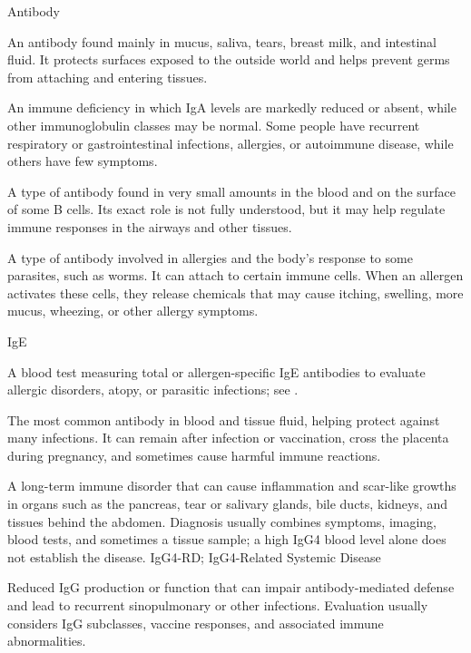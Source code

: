 \synonyms
Antibody

 An antibody found mainly in mucus, saliva, tears, breast milk, and intestinal fluid. It protects surfaces exposed to the outside world and helps prevent germs from attaching and entering tissues.

 An immune deficiency in which IgA levels are markedly reduced or absent, while other immunoglobulin classes may be normal. Some people have recurrent respiratory or gastrointestinal infections, allergies, or autoimmune disease, while others have few symptoms.

 A type of antibody found in very small amounts in the blood and on the surface of some B cells. Its exact role is not fully understood, but it may help regulate immune responses in the airways and other tissues.

 A type of antibody involved in allergies and the body's
response to some parasites, such as worms. It can attach to certain immune cells.
When an allergen activates these cells, they release chemicals that may cause
itching, swelling, more mucus, wheezing, or other allergy symptoms.

\synonyms
IgE

 A blood test measuring total or allergen-specific IgE antibodies to evaluate allergic disorders, atopy, or parasitic infections; see .

 The most common antibody in blood and tissue fluid, helping protect against many infections. It can remain after infection or vaccination, cross the placenta during pregnancy, and sometimes cause harmful immune reactions.

 A long-term immune disorder that can cause inflammation and scar-like growths in organs such as the pancreas, tear or salivary glands, bile ducts, kidneys, and tissues behind the abdomen. Diagnosis usually combines symptoms, imaging, blood tests, and sometimes a tissue sample; a high IgG4 blood level alone does not establish the disease.
\synonyms
IgG4-RD; IgG4-Related Systemic Disease

 Reduced IgG production or function that can impair antibody-mediated defense and lead to recurrent sinopulmonary or other infections. Evaluation usually considers IgG subclasses, vaccine responses, and associated immune abnormalities.


